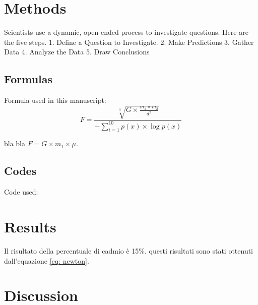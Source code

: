 \documentclass[a4paper, 12pt]{article}
\begin{document}
\section{Methods}
Scientists use a dynamic, open-ended process to investigate questions. Here are the five steps.
1. Define a Question to Investigate.
2. Make Predictions
3. Gather Data
4. Analyze the Data
5. Draw Conclusions


\subsection{Formulas}
Formula used in this manuscript:
\begin{equation}
F = \frac {\sqrt[3]{G \times \frac{m_{1} \times m_{2}}{d^{2}}}}{-\sum_{i=1}^{10}{p(x) \times \log{p(x)}}}
\label{eq: newton}
\end{equation}

bla bla $F = G \times m_{1} \times \mu$.

\subsection{Codes}
Code used:

\section{Results}
Il risultato della percentuale di cadmio è 15\%.
questi risultati sono stati ottenuti dall'equazione \ref{eq: newton}.

\section{Discussion}
\end{document}
